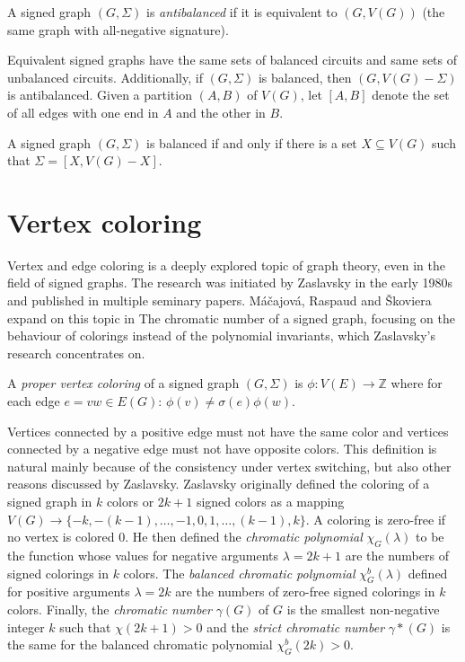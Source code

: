 \begin{definition}
    A signed graph $(G, \Sigma)$ is \textit{antibalanced} if it is equivalent to $(G, V(G))$ (the same graph with all-negative signature).
\end{definition}

Equivalent signed graphs have the same sets of balanced circuits and same sets of unbalanced circuits.
Additionally, if $(G, \Sigma)$ is balanced, then $(G, V(G) - \Sigma)$ is antibalanced.
Given a partition $(A, B)$ of $V(G)$, let $[A, B]$ denote the set of all edges with one end in $A$ and the other in $B$.

\begin{theorem}\label{vertex-set-partition}
    A signed graph $(G, \Sigma)$ is balanced if and only if there is a set $X \subseteq V(G)$ such that $\Sigma = [X, V(G) - X]$.
\end{theorem}



\section{Vertex coloring}

Vertex and edge coloring is a deeply explored topic of graph theory, even in the field of signed graphs.
The research was initiated by Zaslavsky\cite{zaslavsky-graphs} in the early 1980s and published in multiple seminary papers\cite{zaslavsky-invariants,zaslavsky-coloring,zaslavsky-colorful}.
Máčajová, Raspaud and Škoviera expand on this topic in The chromatic number of a signed graph\cite{chromatic-number},
focusing on the behaviour of colorings instead of the polynomial invariants, which Zaslavsky's research concentrates on.

\begin{definition}[Zaslavsky]
    A \textit{proper vertex coloring} of a signed graph $(G, \Sigma)$ is 
    $\phi : V(E) \rightarrow \mathbb{Z}$
    where for each edge $e = vw \in E(G)$: $\phi (v) \neq \sigma (e) \phi (w)$.
\end{definition}

Vertices connected by a positive edge must not have the same color and vertices connected by a negative edge must not have opposite colors.
This definition is natural mainly because of the consistency under vertex switching, but also other reasons discussed by Zaslavsky.
Zaslavsky originally defined the coloring of a signed graph in $k$ colors or $2k+1$ signed colors as 
a mapping $V(G) \rightarrow \{-k, -(k-1), \dots, -1,0,1, \dots , (k-1), k\}$. 
A coloring is zero-free if no vertex is colored 0. He then defined the \textit{chromatic polynomial} $\chi _G (\lambda)$ to be the function
whose values for negative arguments $\lambda = 2k + 1$ are the numbers of signed colorings in $k$ colors. The \textit{balanced chromatic polynomial}
$\chi _G ^b (\lambda)$ defined
for positive arguments $\lambda = 2k$ are the numbers of zero-free signed colorings in $k$ colors.
Finally, the \textit{chromatic number} $\gamma(G)$ of $G$ is the smallest non-negative integer $k$ such that $\chi (2k+1) > 0$ and the \textit{strict chromatic number} $\gamma * (G)$ is the 
same for the balanced chromatic polynomial $\chi _G ^b (2k) > 0$.

